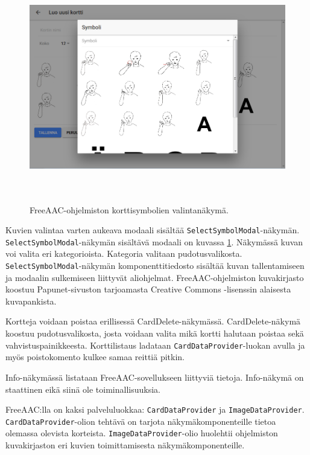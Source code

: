 \documentclass[utf8]{gradu3}
\begin{document}
\begin{figure}[h]\centering
  \includegraphics[height=10cm,keepaspectratio]{select-symbol-modal-layout}
  \caption[FreeAAC-ohjelmiston korttisymbolien valintanäkymä.]
  {FreeAAC-ohjelmiston korttisymbolien valintanäkymä.}
  \label{fig:select-symbol-modal-layout}
\end{figure}

Kuvien valintaa varten aukeava modaali sisältää \texttt{SelectSymbolModal}-näkymän. \texttt{SelectSymbolModal}-näkymän sisältävä modaali on kuvassa \ref{fig:select-symbol-modal-layout}. Näkymässä kuvan voi valita eri kategorioista. Kategoria valitaan pudotusvalikosta. \texttt{SelectSymbolModal}-näkymän komponenttitiedosto sisältää kuvan tallentamiseen ja modaalin sulkemiseen liittyvät aliohjelmat. FreeAAC-ohjelmiston kuvakirjasto koostuu Papunet-sivuston tarjoamasta Creative Commons -lisenssin alaisesta kuvapankista.

Kortteja voidaan poistaa erillisessä CardDelete-näkymässä. CardDelete-näkymä koostuu pudotusvalikosta, josta voidaan valita mikä kortti halutaan poistaa sekä vahvistuspainikkeesta. Korttilistaus ladataan \texttt{CardDataProvider}-luokan avulla ja myös poistokomento kulkee samaa reittiä pitkin.

Info-näkymässä listataan FreeAAC-sovellukseen liittyviä tietoja. Info-näkymä on staattinen eikä siinä ole toiminallisuuksia.

FreeAAC:lla on kaksi palveluluokkaa: \texttt{CardDataProvider} ja \texttt{ImageDataProvider}. \texttt{CardDataProvider}-olion tehtävä on tarjota näkymäkomponenteille tietoa olemassa olevista korteista. \texttt{ImageDataProvider}-olio huolehtii ohjelmiston kuvakirjaston eri kuvien toimittamisesta näkymäkomponenteille.
\end{document}
